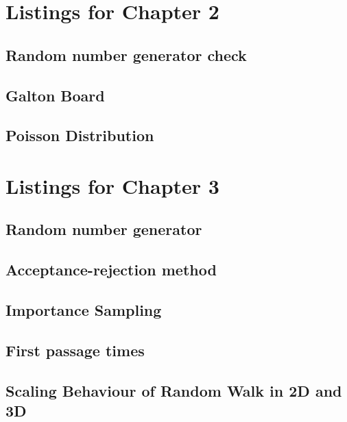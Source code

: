 \section{Listings for Chapter 2}

\subsection{Random number generator check}

\subsection{Galton Board}

\subsection{Poisson Distribution}

\section{Listings for Chapter 3}

\subsection{Random number generator}

\subsection{Acceptance-rejection method}

\subsection{Importance Sampling}

\subsection{First passage times}

\subsection{Scaling Behaviour of Random Walk in 2D and 3D}

